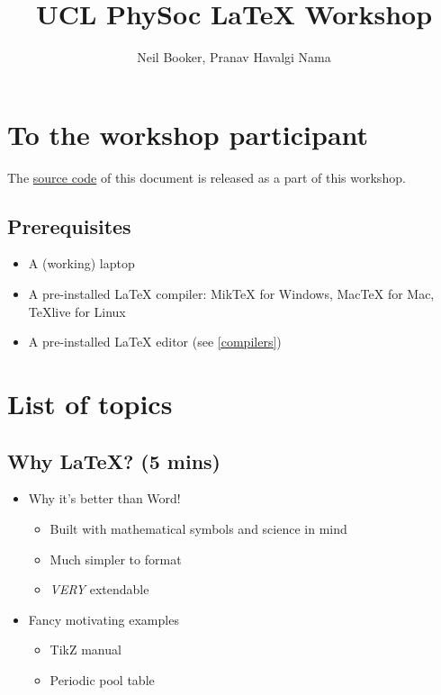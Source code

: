 \documentclass[a4paper]{article}
\begin{document}
\title{UCL PhySoc {\LaTeX} Workshop}
\author{Neil Booker, Pranav Havalgi Nama}
\maketitle
\tableofcontents

\section{To the workshop participant}

The \href{https://github.com/PranavHN/LaTeX-workshop}{source code} of this document is released as a part of this workshop.

\subsection{Prerequisites}

\begin{itemize}
	\item A (working) laptop
	\item A pre-installed {\LaTeX} compiler: MikTeX for Windows, MacTeX for Mac, TeXlive for Linux
	\item A pre-installed {\LaTeX} editor (see \ref{compilers})
\end{itemize}

\section{List of topics}

\subsection{Why {\LaTeX}? (5 mins)}

\begin{itemize}
	\item Why it's better than Word!
	\begin{itemize}
		\item Built with mathematical symbols and science in mind
		\item Much simpler to format
		\item \textit{VERY} extendable
	\end{itemize}
	
	\item Fancy motivating examples
	\begin{itemize}
		\item TikZ manual
		\item Periodic pool table \cite{PeriodicPoolTable}
	\end{itemize}
\end{itemize}
\end{document}
